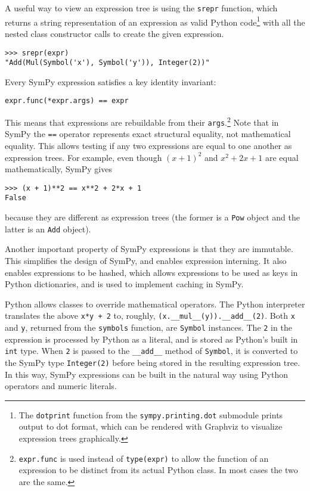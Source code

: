 A useful way to view an expression tree is using the \texttt{srepr} function, which
returns a string representation of an expression as valid Python code\footnote{
\label{note:dotprint}
The \texttt{dotprint} function from the \texttt{sympy.printing.dot} submodule
prints output to dot format, which can be rendered with Graphviz to
visualize expression trees graphically.}
with all the nested class constructor calls to create the given expression.
\begin{verbatim}
>>> srepr(expr)
"Add(Mul(Symbol('x'), Symbol('y')), Integer(2))"
\end{verbatim}

Every SymPy expression satisfies a key identity invariant:
\begin{verbatim}
expr.func(*expr.args) == expr
\end{verbatim}
This means that expressions are
rebuildable from their \texttt{args}.\footnote{\texttt{expr.func} is used
instead of \texttt{type(expr)} to allow the function of an expression to be
distinct from its actual Python class. In most cases the two are the same.}
Note that in SymPy the \texttt{==} operator represents exact
structural equality, not mathematical equality. This allows testing if any two
expressions are equal to one another as expression trees. For example, even
though ${(x + 1)}^2$ and $x^2 + 2x + 1$ are equal mathematically, SymPy gives
\begin{verbatim}
>>> (x + 1)**2 == x**2 + 2*x + 1
False
\end{verbatim}
because they are different as expression trees (the former is a \verb|Pow|
object and the latter is an \verb|Add| object).

Another important property of SymPy expressions is that they are immutable.
This simplifies the design of SymPy, and enables expression interning. It also
enables expressions to be hashed, which allows expressions to be used as keys
in Python dictionaries, and is used to implement caching in SymPy.

Python allows classes to override mathematical operators. The Python
interpreter translates the above \texttt{x*y + 2} to, roughly,
\verb|(x.__mul__(y)).__add__(2)|. Both \texttt{x} and \texttt{y}, returned
from the \texttt{symbols} function, are \texttt{Symbol} instances. The
\texttt{2} in the expression is processed by Python as a literal, and is
stored as Python's built in \texttt{int} type. When \texttt{2} is passed to the
\verb|__add__| method of \texttt{Symbol}, it is converted to the SymPy type
\verb|Integer(2)| before being stored in the resulting expression tree. In
this way, SymPy expressions can be built in the natural way using Python
operators and numeric literals.

